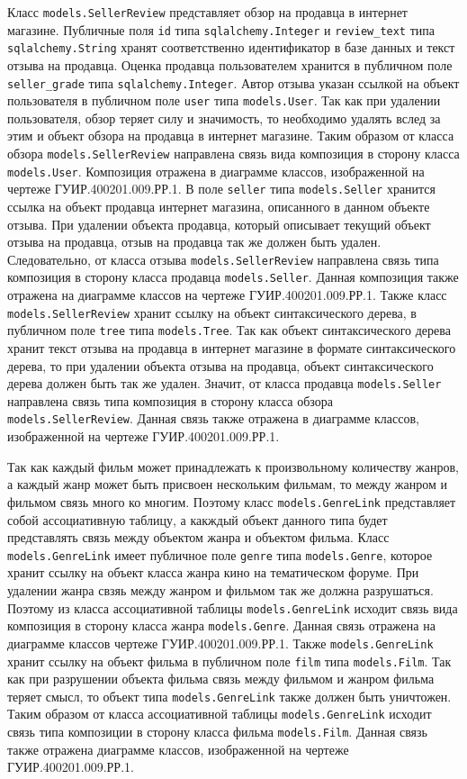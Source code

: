 Класс \texttt{models.SellerReview} представляет обзор на продавца в интернет магазине. Публичные поля \texttt{id} типа \texttt{sqlalchemy.Integer} и \texttt{review\_text} типа \texttt{sqlalchemy.String} хранят соответственно идентификатор в базе данных и текст отзыва на продавца. Оценка продавца пользователем хранится в публичном поле \texttt{seller\_grade} типа \texttt{sqlalchemy.Integer}. Автор отзыва указан ссылкой на объект пользователя в публичном поле \texttt{user} типа \texttt{models.User}. Так как при удалении пользователя, обзор теряет силу и значимость, то необходимо удалять вслед за этим и объект обзора на продавца в интернет магазине. Таким образом от класса обзора \texttt{models.SellerReview} направлена связь вида композиция в сторону класса \texttt{models.User}. Композиция отражена в диаграмме классов, изображенной на чертеже ГУИР.400201.009.РР.1. В поле \texttt{seller} типа \texttt{models.Seller} хранится ссылка на объект продавца интернет магазина, описанного в данном объекте отзыва. При удалении объекта продавца, который описывает текущий объект отзыва на продавца, отзыв на продавца так же должен быть удален. Следовательно, от класса отзыва \texttt{models.SellerReview} направлена связь типа композиция в сторону класса продавца \texttt{models.Seller}. Данная композиция также отражена на диаграмме классов на чертеже ГУИР.400201.009.РР.1. Также класс \texttt{models.SellerRevi\-ew} хранит ссылку на объект синтаксического дерева, в публичном поле \texttt{tree} типа \texttt{models.Tree}. Так как объект синтаксического дерева хранит текст отзыва на продавца в интернет магазине в формате синтаксического дерева, то при удалении объекта отзыва на продавца, объект синтаксического дерева должен быть так же удален. Значит, от класса продавца \texttt{models.Seller} направлена связь типа композиция в сторону класса обзора \texttt{models.SellerReview}. Данная связь также отражена в диаграмме классов, изображенной на чертеже ГУИР.400201.009.РР.1.

Так как каждый фильм может принадлежать к произвольному количеству жанров, а каждый жанр может быть присвоен нескольким фильмам, то между жанром и фильмом связь много ко многим. Поэтому класс \texttt{models.Gen\-reLink} представляет собой ассоциативную таблицу, а какждый объект данного типа будет представлять связь между объектом жанра и объектом фильма. Класс \texttt{models.GenreLink} имеет публичное поле \texttt{genre} типа \texttt{models.Genre}, которое хранит ссылку на объект класса жанра кино на тематическом форуме. При удалении жанра свзяь между жанром и фильмом так же должна разрушаться. Поэтому из класса ассоциативной таблицы \texttt{models.GenreLink} исходит связь вида композиция в сторону класса жанра \texttt{models.Genre}. Данная связь отражена на диаграмме классов чертеже ГУИР.400201.009.РР.1. Также \texttt{models.GenreLink} хранит ссылку на объект фильма в публичном поле \texttt{film} типа \texttt{models.Film}. Так как при разрушении объекта фильма связь между фильмом и жанром фильма теряет смысл, то объект типа \texttt{models.GenreLink} также должен быть уничтожен. Таким образом от класса ассоциативной таблицы \texttt{models.GenreLink} исходит связь типа композиции в сторону класса фильма \texttt{models.Film}. Данная связь также отражена диаграмме классов, изображенной на чертеже ГУИР.400201.009.РР.1.

